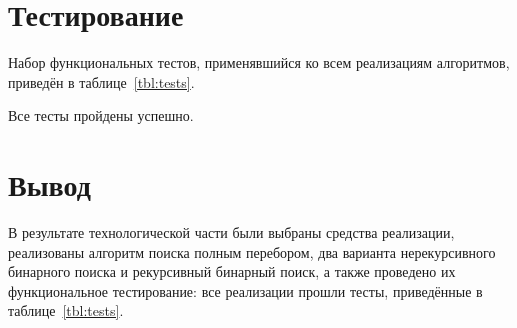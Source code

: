 \section{Тестирование}
Набор функциональных тестов, применявшийся ко всем реализациям алгоритмов, приведён в таблице~\ref{tbl:tests}.

Все тесты пройдены успешно.

\section{Вывод}
В результате технологической части были выбраны средства реализации,
реализованы алгоритм поиска полным перебором, два варианта нерекурсивного
бинарного поиска и рекурсивный бинарный поиск, а также проведено их
функциональное тестирование: все реализации прошли тесты, приведённые
в таблице~\ref{tbl:tests}.


